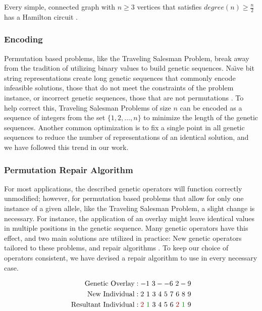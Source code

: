\begin{thm}
Every simple, connected graph with $n \geq 3$ vertices that satisfies $degree(n) \geq \frac{n}{2}$ has a Hamilton circuit \cite{Wolfram}.
\end{thm}

\subsubsection*{Encoding}
Permutation based problems, like the Traveling Salesman Problem, break away from the tradition of utilizing binary values to build genetic sequences. Na\"{\i}ve bit string representations create long genetic sequences that commonly encode infeasible solutions, those that do not meet the constraints of the problem instance, or incorrect genetic sequences, those that are not permutations \cite{Potvin96}. To help correct this, Traveling Salesman Problems of size $n$ can be encoded as a sequence of integers from the set $\{1, 2, \ldots, n\}$ to minimize the length of the genetic sequences. Another common optimization is to fix a single point in all genetic sequences to reduce the number of representations of an identical solution, and we have followed this trend in our work. 

\subsubsection*{Permutation Repair Algorithm}
For most applications, the described genetic operators will function correctly unmodified; however, for permutation based problems that allow for only one instance of a given allele, like the Traveling Salesman Problem, a slight change is necessary. For instance, the application of an overlay might leave identical values in multiple positions in the genetic sequence. Many genetic operators have this effect, and two main solutions are utilized in practice: New genetic operators tailored to these problems, and repair algorithms \cite{Larranaga99}. To keep our choice of operators consistent, we have devised a repair algorithm to use in every necessary case.
 
\begin{align*}
\text{Genetic Overlay} &:   -1~3--6~2-9				\\
\text{New Individual} &: 2~1~3~4~5~7~6~8~9			\\		
\text{Resultant Individual} &: {\color{myred}2}~{\color{mygreen}1}~3~4~5~6~{\color{myred}2}~{\color{mygreen}1}~9
\end{align*}

